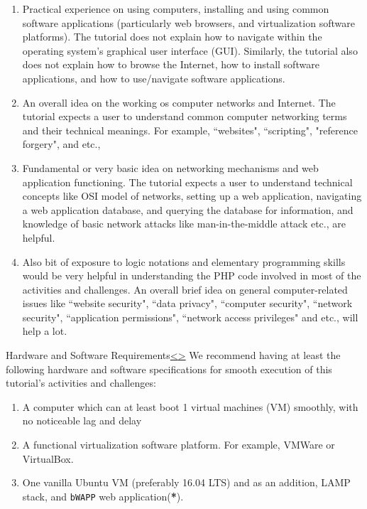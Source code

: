 \documentclass[12pt]{extarticle}
\newenvironment{instructionblock}{\Large\bgroup}{\egroup}
\newcommand{\ben}{\begin{enumerate}}
\newcommand{\een}{\end{enumerate}}
\begin{document}
\ben


\item Practical experience on using computers, installing and using common software applications (particularly web browsers, and virtualization software platforms). The tutorial does not explain how to navigate within the operating system's graphical user interface (GUI). Similarly, the tutorial also does not explain how to browse the Internet, how to install software applications, and how to use/navigate software applications. 

\item An overall idea on the working os computer networks and Internet. The tutorial expects a user to understand common computer networking terms and their technical meanings. For example, ``websites", ``scripting", "reference forgery", and etc., 

\item Fundamental or very basic idea on networking mechanisms and web application functioning. The tutorial expects a user to understand technical concepts like OSI model of networks, setting up a web application, navigating a web application database, and querying the database for information, and knowledge of basic network attacks like man-in-the-middle attack etc., are helpful.

\item Also bit of exposure to logic notations and elementary programming skills would be very helpful in understanding the PHP code involved in most of the activities and challenges. An overall brief idea on general computer-related issues like ``website security", ``data privacy", ``computer security", ``network security", ``application permissions", ``network access privileges" and etc., will help a lot.


\een 







\pagebreak
\begin{slide}{Hardware and Software Requirements}{\hyperref[slide 2]{\textless}\hyperref[slide 4]{\textgreater}}
	\begin{instructionblock}
		We recommend having at least the following hardware and software specifications for smooth execution of this tutorial's activities and challenges:
		\begin{enumerate}
			\item {A computer which can at least boot 1 virtual machines (VM) smoothly, with no noticeable lag and delay}
			\item {A functional virtualization software platform. For example, VMWare or VirtualBox.}
			\item {One vanilla Ubuntu VM (preferably 16.04 LTS) and as an addition, LAMP stack, and \texttt{bWAPP} web application(\textbf{*}).  }
		\end{enumerate}
	\end{instructionblock}
\end{slide}
\end{document}
